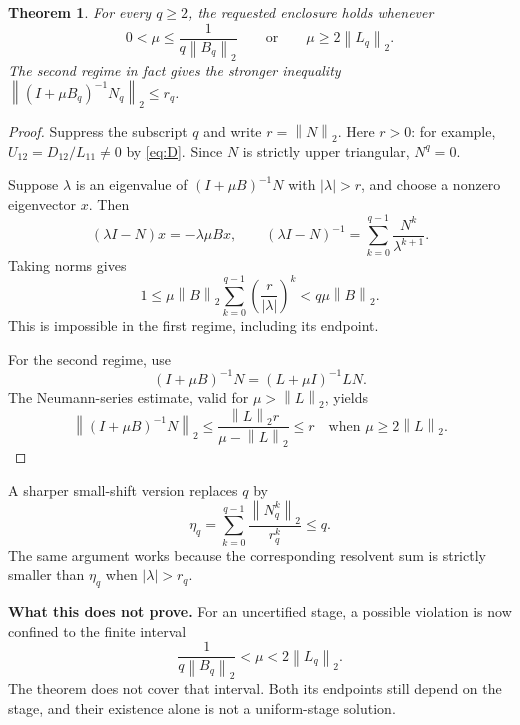 \documentclass[11pt,letterpaper]{article}
\newtheorem{theorem}{Theorem}[section]
\newcommand{\norm}[1]{\left\|#1\right\|_2}
\begin{document}
\begin{theorem}\label{thm:shifts}
For every $q\ge2$, the requested enclosure holds whenever
\begin{equation}\label{eq:regimes}
 0<\mu\le\frac{1}{q\norm{B_q}}
 \qquad\text{or}\qquad
 \mu\ge2\norm{L_q}.
\end{equation}
The second regime in fact gives the stronger inequality
$\norm{(I+\mu B_q)^{-1}N_q}\le r_q$.
\end{theorem}
\begin{proof}
Suppress the subscript $q$ and write $r=\norm{N}$. Here $r>0$: for example,
$U_{12}=D_{12}/L_{11}\ne0$ by \eqref{eq:D}. Since $N$ is strictly upper
triangular, $N^q=0$.

Suppose $\lambda$ is an eigenvalue of $(I+\mu B)^{-1}N$ with
$|\lambda|>r$, and choose a nonzero eigenvector $x$. Then
\[
 (\lambda I-N)x=-\lambda\mu Bx,
 \qquad
 (\lambda I-N)^{-1}=\sum_{k=0}^{q-1}\frac{N^k}{\lambda^{k+1}}.
\]
Taking norms gives
\[
 1\le\mu\norm{B}\sum_{k=0}^{q-1}\left(\frac r{|\lambda|}\right)^k
 <q\mu\norm{B}.
\]
This is impossible in the first regime, including its endpoint.

For the second regime, use
\[
 (I+\mu B)^{-1}N=(L+\mu I)^{-1}LN.
\]
The Neumann-series estimate, valid for $\mu>\norm{L}$, yields
\[
 \norm{(I+\mu B)^{-1}N}
 \le \frac{\norm{L}r}{\mu-\norm{L}}\le r
 \quad\text{when }\mu\ge2\norm{L}.
\]
\end{proof}

A sharper small-shift version replaces $q$ by
\[
 \eta_q=\sum_{k=0}^{q-1}\frac{\norm{N_q^k}}{r_q^k}\le q.
\]
The same argument works because the corresponding resolvent sum is
strictly smaller than $\eta_q$ when $|\lambda|>r_q$.

\textbf{What this does not prove.} For an uncertified stage, a possible
violation is now confined to the finite interval
\[
 \frac{1}{q\norm{B_q}}<\mu<2\norm{L_q}.
\]
The theorem does not cover that interval. Both its endpoints still depend
on the stage, and their existence alone is not a uniform-stage solution.

\newpage
\end{document}
